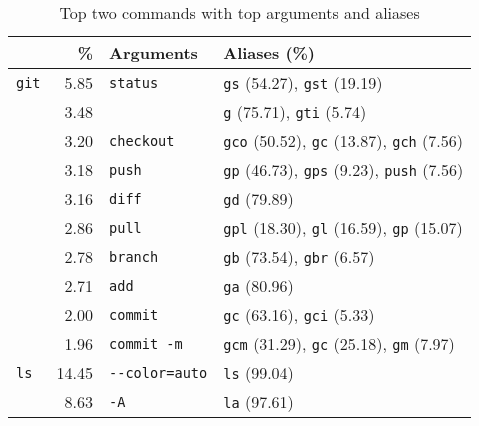 \newcommand{\numx}[1]{{\small (\num{#1})}}
\begin{table}
    \caption{Top two commands with top arguments and aliases}
    \label{tab:command-summary}
    \begin{tabular}{@{}lrll@{}}
        \toprule
                    &           \% &            Arguments &                                                                 Aliases (\%) \\
        \midrule
         \verb|git| &   \num{5.85} &        \verb|status| &                              \verb|gs| \numx{54.27}, \verb|gst| \numx{19.19} \\
                    &   \num{3.48} &              \verb|| &                                \verb|g| \numx{75.71}, \verb|gti| \numx{5.74} \\
                    &   \num{3.20} &      \verb|checkout| &      \verb|gco| \numx{50.52}, \verb|gc| \numx{13.87}, \verb|gch| \numx{7.56} \\
                    &   \num{3.18} &          \verb|push| &      \verb|gp| \numx{46.73}, \verb|gps| \numx{9.23}, \verb|push| \numx{7.56} \\
                    &   \num{3.16} &          \verb|diff| &                                                       \verb|gd| \numx{79.89} \\
                    &   \num{2.86} &          \verb|pull| &      \verb|gpl| \numx{18.30}, \verb|gl| \numx{16.59}, \verb|gp| \numx{15.07} \\
                    &   \num{2.78} &        \verb|branch| &                               \verb|gb| \numx{73.54}, \verb|gbr| \numx{6.57} \\
                    &   \num{2.71} &           \verb|add| &                                                       \verb|ga| \numx{80.96} \\
                    &   \num{2.00} &        \verb|commit| &                               \verb|gc| \numx{63.16}, \verb|gci| \numx{5.33} \\
                    &   \num{1.96} &     \verb|commit -m| &       \verb|gcm| \numx{31.29}, \verb|gc| \numx{25.18}, \verb|gm| \numx{7.97} \\
        \midrule
          \verb|ls| &  \num{14.45} &  \verb|--color=auto| &                                                       \verb|ls| \numx{99.04} \\
                    &   \num{8.63} &            \verb|-A| &                                                       \verb|la| \numx{97.61} \\

\end{tabular}
\end{table}
